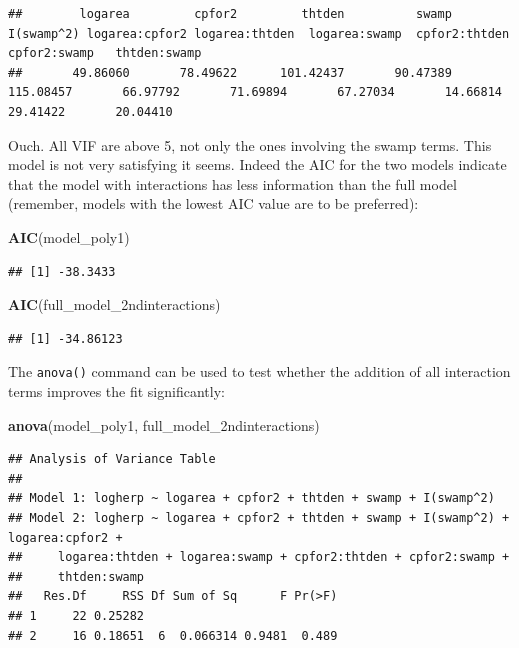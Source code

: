 \documentclass[
  12pt,
]{book}
\newenvironment{Shaded}{\begin{snugshade}}{\end{snugshade}}
\newcommand{\KeywordTok}[1]{\textcolor[rgb]{0.13,0.29,0.53}{\textbf{#1}}}
\newcommand{\NormalTok}[1]{#1}
\begin{document}
\begin{verbatim}
##        logarea         cpfor2         thtden          swamp     I(swamp^2) logarea:cpfor2 logarea:thtden  logarea:swamp  cpfor2:thtden   cpfor2:swamp   thtden:swamp 
##       49.86060       78.49622      101.42437       90.47389      115.08457       66.97792       71.69894       67.27034       14.66814       29.41422       20.04410
\end{verbatim}

Ouch. All VIF are above 5, not only the ones involving the swamp terms. This model is not very satisfying it seems. Indeed the AIC for the two models indicate that the model with interactions has less information than the full model (remember, models with the lowest AIC value are to be preferred):

\begin{Shaded}
\begin{Highlighting}[]
\KeywordTok{AIC}\NormalTok{(model\_poly1)}
\end{Highlighting}
\end{Shaded}

\begin{verbatim}
## [1] -38.3433
\end{verbatim}

\begin{Shaded}
\begin{Highlighting}[]
\KeywordTok{AIC}\NormalTok{(full\_model\_2ndinteractions)}
\end{Highlighting}
\end{Shaded}

\begin{verbatim}
## [1] -34.86123
\end{verbatim}

The \texttt{anova()} command can be used to test whether the addition of all
interaction terms improves the fit significantly:

\begin{Shaded}
\begin{Highlighting}[]
\KeywordTok{anova}\NormalTok{(model\_poly1, full\_model\_2ndinteractions)}
\end{Highlighting}
\end{Shaded}

\begin{verbatim}
## Analysis of Variance Table
## 
## Model 1: logherp ~ logarea + cpfor2 + thtden + swamp + I(swamp^2)
## Model 2: logherp ~ logarea + cpfor2 + thtden + swamp + I(swamp^2) + logarea:cpfor2 + 
##     logarea:thtden + logarea:swamp + cpfor2:thtden + cpfor2:swamp + 
##     thtden:swamp
##   Res.Df     RSS Df Sum of Sq      F Pr(>F)
## 1     22 0.25282                           
## 2     16 0.18651  6  0.066314 0.9481  0.489
\end{verbatim}
\end{document}
